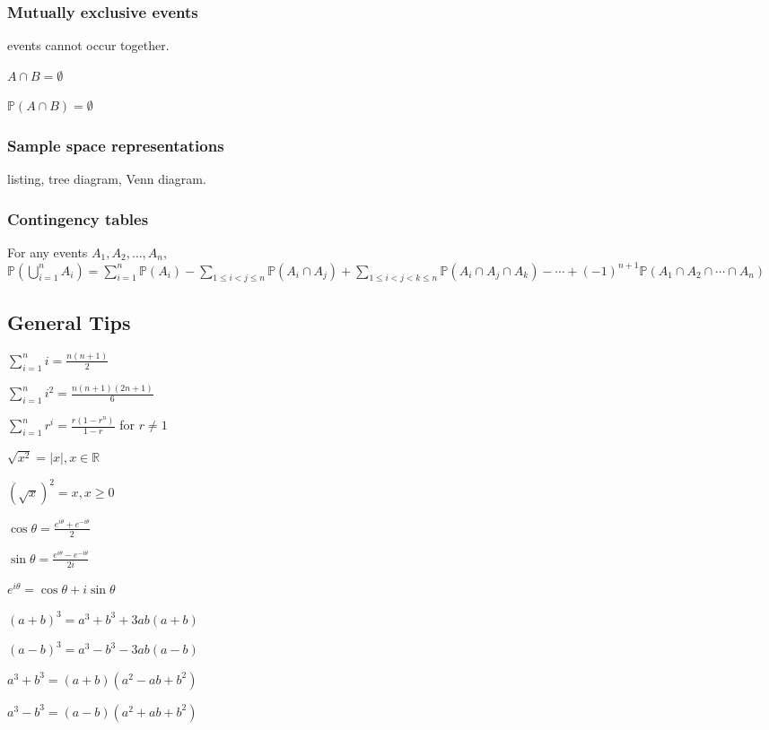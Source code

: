 \documentclass[5pt]{article}
\begin{document}
\begin{multicols}{2}
\subsubsection{Mutually exclusive events}
events cannot occur together.\\
\begin{itemize*}
  \item $A\cap B = \emptyset\;\;$
  \item $\mathbb{P}(A\cap B) = \emptyset$
\end{itemize*}

\subsubsection{Sample space representations}
listing, tree diagram, Venn diagram.

\subsubsection{Contingency tables}

\begin{theorem}
  For any events $A_1, A_2, \ldots, A_n$,\\
  $\mathbb{P}(\bigcup_{i=1}^n A_i) = \sum_{i=1}^n \mathbb{P}(A_i) - \sum_{1 \leq i < j \leq n} \mathbb{P}(A_i \cap A_j) + \sum_{1 \leq i < j < k \leq n} \mathbb{P}(A_i \cap A_j \cap A_k) - \cdots + (-1)^{n+1} \mathbb{P}(A_1 \cap A_2 \cap \cdots \cap A_n)$
\end{theorem}

\end{multicols}
\subsection{General Tips}
\begin{itemize*}
    \item $\sum_{i=1}^{n}i=\frac{n(n+1)}{2}$
    \item $\sum_{i=1}^{n}i^2=\frac{n(n+1)(2n+1)}{6}$
    \item $\sum_{i=1}^n r^i=\frac{r(1-r^n)}{1-r}$ for $r \neq 1$
    \item $\sqrt{x^2}=|x|,x\in\mathbb{R}$
    \item $(\sqrt{x})^2=x, x\geq 0$
    \item $\cos{\theta}=\frac{e^{i\theta}+e^{-i\theta}}{2}$
    \item $\sin{\theta}=\frac{e^{i\theta}-e^{-i\theta}}{2i}$
    \item $e^{i\theta}=\cos{\theta}+i\sin{\theta}$
    \item $(a+b)^3=a^3+b^3+3ab(a+b)$
    \item $(a-b)^3=a^3-b^3-3ab(a-b)$
    \item $a^3+b^3=(a+b)(a^2-ab+b^2)$
    \item $a^3-b^3=(a-b)(a^2+ab+b^2)$
\end{itemize*}
\end{document}
